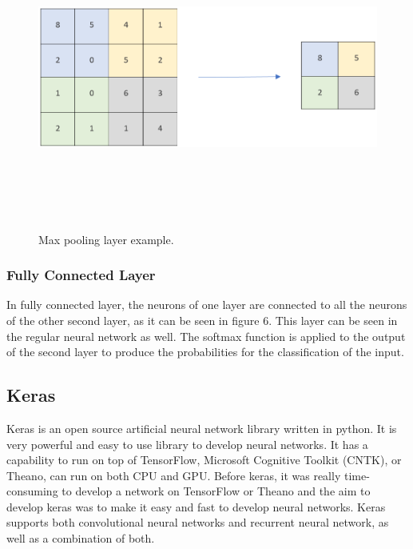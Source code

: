 \begin{figure}[htpb]
	\centering
	\includegraphics[width=12cm,height=10cm,keepaspectratio=true]{images/maxpool}
	\caption{
		Max pooling layer example.
	}
	\label{fig:maxpool}
\end{figure}

\subsubsection{Fully Connected Layer}
In fully connected layer, the neurons of one layer are connected to all the neurons of the other second layer, as it can be seen in figure 6. This layer can be seen in the regular neural network as well. The softmax function is applied to the output of the second layer to produce the probabilities for the classification of the input. 

\subsection{Keras}

Keras is an open source artificial neural network library written in python. It is very powerful and easy to use library to develop neural networks. It has a capability to run on top of TensorFlow, Microsoft Cognitive Toolkit (CNTK), or Theano, can run on both CPU and GPU. Before keras, it was really time-consuming to develop a network on TensorFlow or Theano and the aim to develop keras was to make it easy and fast to develop neural networks. Keras supports both convolutional neural networks and recurrent neural network, as well as a combination of both.

